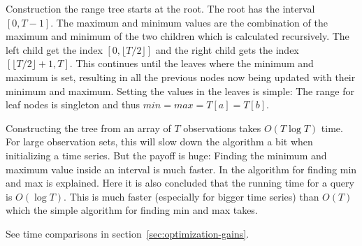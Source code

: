 Construction the range tree starts at the root. The root has the interval
$[0,T-1]$. The maximum and minimum values are the combination of the maximum and
minimum of the two children which is calculated recursively. The left child get
the index $[0, \lfloor T/2 \rfloor]$ and the right child gets the index $[\lfloor
T/2 \rfloor + 1, T ]$. This
continues until the leaves where the minimum and maximum is set, resulting in
all the previous nodes now being updated with their minimum and maximum. Setting
the values in the leaves is simple: The range for leaf nodes is singleton and
thus $min = max = T[a] = T[b]$. 

Constructing the tree from an array of $T$ observations takes 
$O(T \log T)$ time. For large observation sets, this will slow down the
algorithm a bit when initializing a time series. But the payoff is huge: Finding
the minimum and maximum value inside an interval is much faster. In
\cite{compstat14} the algorithm for finding min and max is explained. Here it is
also concluded that the running time for a query is $O(\log T)$. This is much
faster (especially for bigger time series) than $O(T)$ which the simple
algorithm for finding min and max takes. 

See time comparisons in section~\ref{sec:optimization-gains}. 